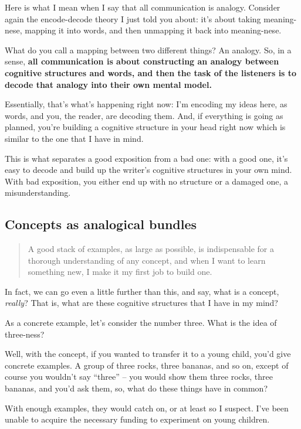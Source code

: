 Here is what I mean when I say that all communication is analogy.
Consider again the encode-decode theory I just told you about: it's
about taking meaning-nese, mapping it into words, and then unmapping it
back into meaning-nese.

What do you call a mapping between two different things? An analogy. So,
in a sense, \textbf{all communication is about constructing an analogy
between cognitive structures and words, and then the task of the
listeners is to decode that analogy into their own mental model.}

Essentially, that's what's happening right now: I'm encoding my ideas
here, as words, and you, the reader, are decoding them. And, if
everything is going as planned, you're building a cognitive structure in
your head right now which is similar to the one that I have in mind.

This is what separates a good exposition from a bad one: with a good
one, it's easy to decode and build up the writer's cognitive structures
in your own mind. With bad exposition, you either end up with no
structure or a damaged one, a misunderstanding.

\subsection{Concepts as analogical
  bundles}\label{concepts-as-analogical-bundles}

\begin{quote}
A good stack of examples, as large as possible, is indispensable for a thorough
understanding of any concept, and when I want to learn something new, I make it
my first job to build one.
\end{quote}

In fact, we can go even a little further than this, and say, what is a
concept, \emph{really}? That is, what are these cognitive structures
that I have in my mind?

As a concrete example, let's consider the number three. What is the idea
of three-ness?

Well, with the concept, if you wanted to transfer it to a young child,
you'd give concrete examples. A group of three rocks, three bananas, and
so on, except of course you wouldn't say ``three'' -- you would show
them three rocks, three bananas, and you'd ask them, so, what do these
things have in common?

With enough examples, they would catch on, or at least so I suspect.
I've been unable to acquire the necessary funding to experiment on young
children.

